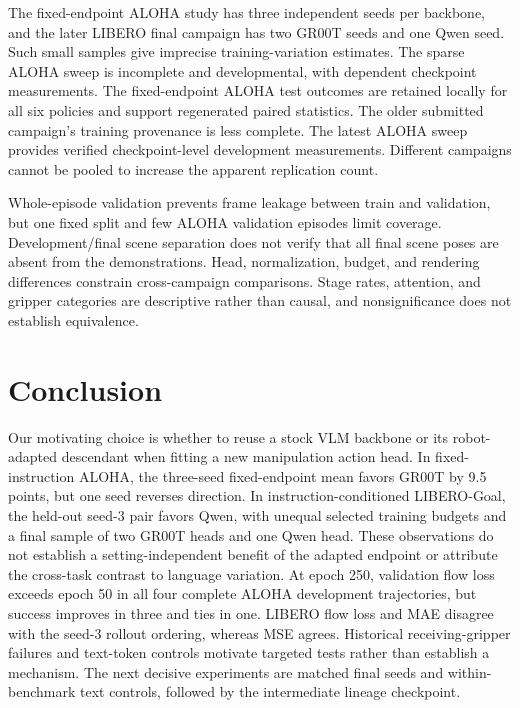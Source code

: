 \documentclass[conference]{IEEEtran}
\begin{document}
The fixed-endpoint ALOHA study has three independent seeds per backbone, and
the later LIBERO final campaign has two GR00T seeds and one Qwen seed. Such
small samples give imprecise training-variation estimates. The sparse ALOHA
sweep is incomplete and developmental, with dependent checkpoint measurements.
The fixed-endpoint ALOHA test outcomes are retained locally for all six
policies and support regenerated paired statistics. The older submitted
campaign's training provenance is less complete. The latest ALOHA sweep
provides verified checkpoint-level development measurements. Different
campaigns cannot be pooled to increase the apparent replication count.

Whole-episode validation prevents frame leakage between train and validation,
but one fixed split and few ALOHA validation episodes limit coverage.
Development/final scene separation does not verify that all final scene poses
are absent from the demonstrations. Head, normalization, budget, and rendering
differences constrain cross-campaign comparisons. Stage rates, attention, and
gripper categories are descriptive rather than causal, and nonsignificance
does not establish equivalence.

\section{Conclusion}
Our motivating choice is whether to reuse a stock VLM backbone or its
robot-adapted descendant when fitting a new manipulation action head. In
fixed-instruction ALOHA, the three-seed fixed-endpoint mean favors GR00T by
9.5 points, but one seed reverses direction. In instruction-conditioned
LIBERO-Goal, the held-out seed-3 pair favors Qwen, with unequal
selected training budgets and a final sample of two GR00T heads and one Qwen
head. These observations do not establish a setting-independent benefit of the adapted endpoint or
attribute the cross-task contrast to language variation. At epoch 250,
validation flow loss exceeds epoch 50 in all four complete ALOHA development
trajectories, but success improves in three and ties in one. LIBERO flow
loss and MAE disagree with the seed-3 rollout ordering, whereas MSE agrees.
Historical receiving-gripper failures and text-token controls motivate
targeted tests rather than establish a mechanism. The next decisive
experiments are matched final seeds and within-benchmark text controls,
followed by the intermediate lineage checkpoint.
\end{document}
